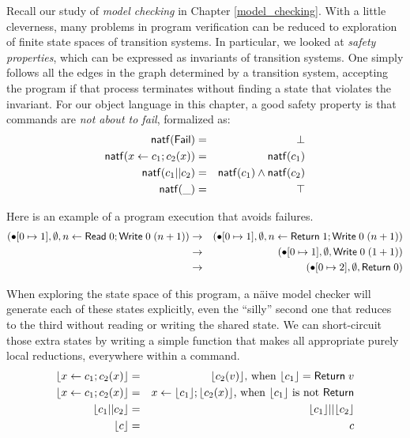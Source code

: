 \documentclass{amsbook}
\theoremstyle{definition}
\theoremstyle{remark}
\numberwithin{section}{chapter}
\numberwithin{equation}{chapter}
\begin{document}
Recall our study of \emph{model checking} in Chapter \ref{model_checking}.
With a little cleverness, many problems in program verification can be reduced to exploration of finite state spaces of transition systems.
In particular, we looked at \emph{safety properties}, which can be expressed as invariants of transition systems.
One simply follows all the edges in the graph determined by a transition system, accepting the program if that process terminates without finding a state that violates the invariant.
For our object language in this chapter, a good safety property is that commands are \emph{not about to fail}, formalized as:
\begin{eqnarray*}
  \mathsf{natf}(\mathsf{Fail}) &=& \bot \\
  \mathsf{natf}(x \leftarrow c_1; c_2(x)) &=& \mathsf{natf}(c_1) \\
  \mathsf{natf}(c_1 || c_2) &=& \mathsf{natf}(c_1) \land \mathsf{natf}(c_2) \\
  \mathsf{natf}(\_) &=& \top
\end{eqnarray*}

Here is an example of a program execution that avoids failures.
\begin{eqnarray*}
  (\bullet[0 \mapsto 1], \emptyset, n \leftarrow \mathsf{Read} \; 0; \mathsf{Write} \; 0 \; (n+1))
  &\rightarrow& (\bullet[0 \mapsto 1], \emptyset, n \leftarrow \mathsf{Return} \; 1; \mathsf{Write} \; 0 \; (n+1)) \\
  &\rightarrow& (\bullet[0 \mapsto 1], \emptyset, \mathsf{Write} \; 0 \; (1+1)) \\
  &\rightarrow& (\bullet[0 \mapsto 2], \emptyset, \mathsf{Return} \; 0)
\end{eqnarray*}

\newcommand{\rl}[1]{{\left \lfloor #1 \right \rfloor}}

When exploring the state space of this program, a n\"aive model checker will generate each of these states explicitly, even the ``silly'' second one that reduces to the third without reading or writing the shared state.
We can short-circuit those extra states by writing a simple function that makes all appropriate purely local reductions, everywhere within a command.
\begin{eqnarray*}
  \rl{x \leftarrow c_1; c_2(x)} &=& \rl{c_2(v)}\textrm{, when $\rl{c_1} = \mt{Return} \; v$} \\
  \rl{x \leftarrow c_1; c_2(x)} &=& x \leftarrow \rl{c_1}; \rl{c_2(x)}\textrm{, when $\rl{c_1}$ is not $\mt{Return}$} \\
  \rl{c_1 || c_2} &=& \rl{c_1} || \rl{c_2} \\
  \rl{c} &=& c
\end{eqnarray*}
\end{document}
